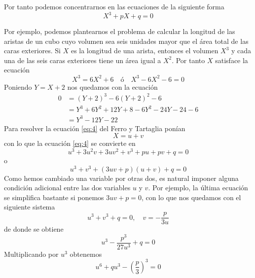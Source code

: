 Por tanto podemos concentrarnos en las ecuaciones de la siguiente forma
\begin{equation}\label{eq:4}
    X^3+pX+q=0
\end{equation}

Por ejemplo, podemos plantearnos el problema de calcular la longitud de las aristas de un cubo cuyo volumen sea seis unidades mayor que el área total de las caras exteriores. Si $X$ es la longitud de una arista, entonces el volumen $X^3$ y cada una de las seis caras exteriores tiene un área igual a $X^2$. Por tanto $X$ satisface la ecuación
$$X^3=6X^2+6\quad\text{ó}\quad X^3-6X^2-6=0$$
Poniendo $Y=X+2$ nos quedamos con la ecuación
\begin{equation*}
    \begin{split}
        0 & = (Y+2)^3 - 6(Y+2)^2 - 6 \\
          & = Y^3 + 6Y^2 + 12Y + 8 - 6Y^2 - 24Y - 24 - 6 \\
          & = Y^3 -12Y - 22
    \end{split}
\end{equation*}
Para resolver la ecuación \ref{eq:4} del Ferro y Tartaglia ponían
$$X=u+v$$
con lo que la ecuación \ref{eq:4} se convierte en
$$u^3+3u^2v+3uv^2+v^3+pu+pv+q=0$$
o
$$u^3+v^3+(3uv+p)(u+v)+q=0$$
Como hemos cambiado una variable por otras dos, es natural imponer alguna condición adicional entre las dos variables $u$ y $v$. Por ejemplo, la última ecuación se simplifica bastante si ponemos $3uv+p=0$, con lo que nos quedamos con el siguiente sistema
$$u^3+v^3+q=0, \quad v=-\frac{p}{3u}$$
de donde se obtiene
$$u^3-\frac{p^3}{27u^3}+q=0$$
Multiplicando por $u^3$ obtenemos
\begin{equation}\label{eq:5}
    u^6+qu^3-\left(\frac{p}{3}\right)^3=0
\end{equation}
